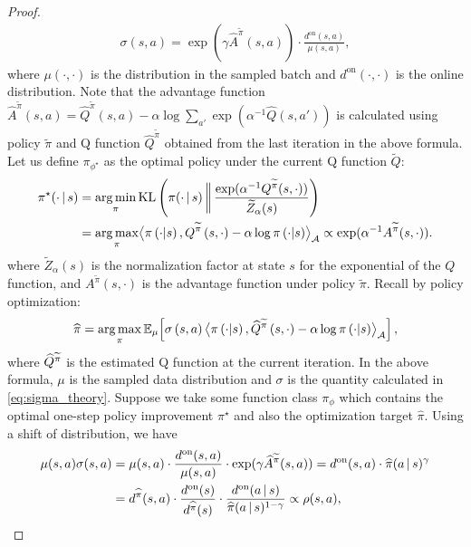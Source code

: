 \begin{proof}
\begin{align}
    \sigma(s, a) = \exp( \gamma \hat A^{\tilde \pi}(s,a))\cdot \frac{d^{\text{on}}(s, a)}{\mu(s,a)}, 
    \label{eq:sigma_theory}
\end{align}
where $\mu(\cdot, \cdot)$ is the distribution in the sampled batch and $d^{\text{on}}(\cdot, \cdot)$ is the online distribution. 
Note that the advantage function $\hat A^{\tilde\pi} (s, a) = \hat Q^{\tilde\pi} (s, a) - \alpha \log \sum_{a'}\exp(\alpha^{-1}\hat Q(s, a'))$ is calculated using policy $\tilde\pi$ and Q function $\hat Q^{\tilde\pi}$ obtained from the last iteration in the above formula.
Let us define $\pi_{\phi^\star}$ as the optimal policy under the current Q function $\tilde Q$:
\begin{align*}
    \pi^\star(\cdot{\,|\,} s) &= \mathop{\rm arg\,min}_{\pi} {\mathrm{KL}} \left( \pi(\cdot {\,|\,} s) \,\bigg\|\, \frac{\exp(\alpha^{-1} Q^{\widetilde{\pi}}(s, \cdot))}{\widetilde Z_\alpha(s)} \right) \\
    &=\mathop{\rm arg\,max}_{\pi}  \bigl\langle{\ensuremath{\pi}\ensuremath{ \left( {\cdot|s} \right) },\ensuremath{Q}^{\widetilde{\ensuremath{\pi}}}\ensuremath{ \left( {s,\cdot} \right) }-\alpha\log\ensuremath{\pi}\ensuremath{ \left( {\cdot|s} \right) }}\bigr\rangle_{\mathcal{A}} \propto \exp(\alpha^{-1}A^{\widetilde{\pi}}(s, \cdot)).
\end{align*}
where $\tilde Z_\alpha(s)$ is the normalization factor at state $s$ for the exponential of the $Q$ function, and $A^{\tilde\pi}(s, \cdot)$ is the advantage function under policy $\tilde\pi$.
Recall by policy optimization:
\begin{align*}
    \widehat\pi = \mathop{\rm arg\,max}_\pi\mathbb{E}_{\mu}\!\left[\sigma \left( {s,a} \right)  \bigl\langle{\ensuremath{\pi}\ensuremath{ \left( {\cdot|s} \right) },\widehat{\ensuremath{Q}}^{\widetilde{\ensuremath{\pi}}}\ensuremath{ \left( {s,\cdot} \right) }-\alpha\log\ensuremath{\pi}\ensuremath{ \left( {\cdot|s} \right) }}\bigr\rangle_{\mathcal{A}}\right], 
\end{align*}
where $\widehat{Q}^{\widetilde\pi}$ is the estimated Q function at the current iteration.
In the above formula, $\mu$ is the sampled data distribution and $\sigma$ is the quantity calculated in \eqref{eq:sigma_theory}. 
Suppose we take some function class $\pi_\phi$ which contains the optimal one-step policy improvement $\pi^\star$ and also the optimization target $\hat\pi$.
Using a shift of distribution, we have 
\begin{align*}
    \mu(s, a) \sigma(s, a) 
        &= \mu(s, a) \cdot \frac{d^{\text{on}}(s, a)}{\mu(s, a)} \cdot \exp(\gamma \hat A^{\tilde\pi}(s, a)) ={d^{\text{on}}(s, a)} \cdot \hat\pi(a\given s)^\gamma \\
        &= d^{\hat\pi}(s, a) \cdot \frac{d^{\text{on}}(s)}{d^{\hat\pi}(s)} \cdot \frac{d^{\text{on}}(a\given s)}{\hat\pi(a\given s)^{1-\gamma}} \propto \rho(s, a),

\end{align*}
\end{proof}
